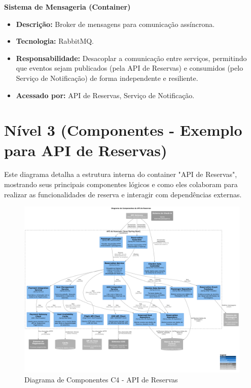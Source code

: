 \textbf{Sistema de Mensageria (Container)}
\begin{itemize}
    \item \textbf{Descrição:} Broker de mensagens para comunicação assíncrona.
    \item \textbf{Tecnologia:} RabbitMQ.
    \item \textbf{Responsabilidade:} Desacoplar a comunicação entre serviços, permitindo que eventos sejam publicados (pela API de Reservas) e consumidos (pelo Serviço de Notificação) de forma independente e resiliente.
    \item \textbf{Acessado por:} API de Reservas, Serviço de Notificação.
\end{itemize}

\section{Nível 3 (Componentes - Exemplo para API de Reservas)}
\label{sec:c4-componentes}

Este diagrama detalha a estrutura interna do container "API de Reservas", mostrando seus principais componentes lógicos e como eles colaboram para realizar as funcionalidades de reserva e interagir com dependências externas.

\begin{figure}[htbp]
    \centering
    \includegraphics[width=1.4\textwidth, angle=90]{../assets/c4-n3-component-api-reservas.pdf}
    \caption{Diagrama de Componentes C4 - API de Reservas}
    \label{fig:c4-componentes-api-reservas}
\end{figure}


